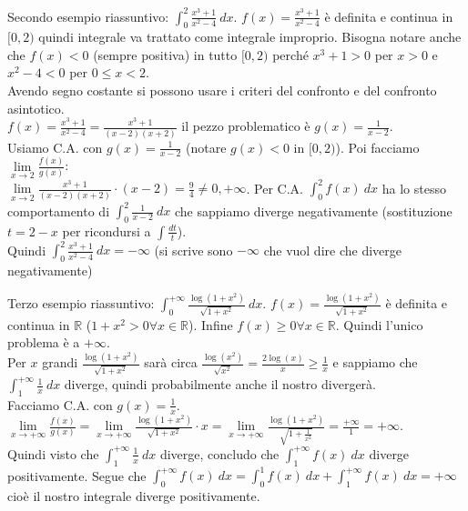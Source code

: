 \begin{example}
Secondo esempio riassuntivo: $\int_0^2 \frac{x^3 + 1}{x^2 -4}\:dx$. $f(x) = \frac{x^3 + 1}{x^2 -4}$ è definita e continua in $[0,2)$ quindi integrale va trattato come integrale improprio. Bisogna notare anche che $f(x) < 0$ (sempre positiva) in tutto $[0,2)$ perché $x^3+1 > 0$ per $x>0$ e $x^2 -4 < 0$ per $0 \leq x < 2$.\\
Avendo segno costante si possono usare i criteri del confronto e del confronto asintotico.\\
$f(x) = \frac{x^3+1}{x^2-4} = \frac{x^3 +1}{(x-2)(x+2)}$ il pezzo problematico è $g(x) = \frac{1}{x-2}$.\\
Usiamo C.A. con $g(x) = \frac{1}{x-2}$ (notare $g(x) < 0$ in $[0,2)$). Poi facciamo $\lim\limits_{x\to 2}\frac{f(x)}{g(x)}$:\\
$\lim\limits_{x\to 2} \frac{x^3 +1}{(x-2)(x+2)}\cdot(x-2) = \frac{9}{4} \neq 0, +\infty$. Per C.A. $\int_0^2 f(x)\:dx$ ha lo stesso comportamento di $\int_0^2 \frac{1}{x-2}\:dx$ che sappiamo diverge negativamente (sostituzione $t=2-x$ per ricondursi a $\int \frac{dt}{t}$).\\
Quindi $\int_0^2 \frac{x^3 + 1}{x^2 -4}\:dx = -\infty$ (si scrive sono $-\infty$ che vuol dire che diverge negativamente)
\end{example}

\begin{example}
Terzo esempio riassuntivo: $\int_0^{+\infty}\frac{\log(1+x^2)}{\sqrt{1+x^2}}\:dx$. $f(x) = \frac{\log(1+x^2)}{\sqrt{1+x^2}}$ è definita e continua in $\mathbb{R}$ ($1 + x^2 > 0 \forall x \in \mathbb{R}$). Infine $f(x) \geq 0 \forall x \in \mathbb{R}$. Quindi l'unico problema è a $+\infty$.\\
Per $x$ grandi $\frac{\log(1+x^2)}{\sqrt{1+x^2}}$ sarà circa $\frac{\log(x^2)}{\sqrt{x^2}} = \frac{2\log(x)}{x} \geq \frac{1}{x}$ e sappiamo che $\int_1^{+\infty}\frac{1}{x}\:dx$ diverge, quindi probabilmente anche il nostro divergerà.\\
Facciamo C.A. con $g(x) = \frac{1}{x}$. $\lim\limits_{x\to +\infty}\frac{f(x)}{g(x)} = \lim\limits_{x\to +\infty} \frac{\log(1+x^2)}{\sqrt{1+x^2}}\cdot x = \lim\limits_{x\to +\infty} \frac{\log(1+x^2)}{\sqrt{1+\frac{1}{x^2}}} = \frac{+\infty}{1} = +\infty$.\\
Quindi visto che $\int_1^{+\infty}\frac{1}{x}\:dx$ diverge, concludo che $\int_1^{+\infty}f(x)\:dx$ diverge positivamente. Segue che $\int_0^{+\infty}f(x)\:dx = \int_0^{1}f(x)\:dx + \int_1^{+\infty}f(x)\:dx = +\infty$ cioè il nostro integrale diverge positivamente.
\end{example}

